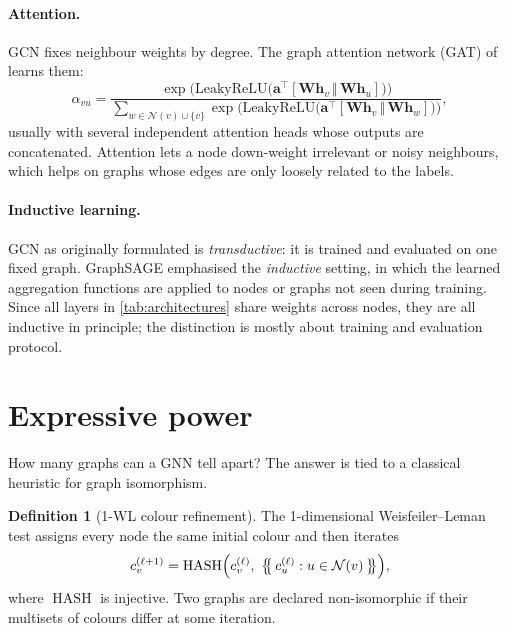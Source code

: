 \documentclass[11pt]{article}
\theoremstyle{plain}
\theoremstyle{definition}
\newtheorem{definition}{Definition}
\newcommand{\N}{\mathcal{N}}
\newcommand{\h}{\mathbf{h}}
\newcommand{\W}{\mathbf{W}}
\begin{document}
\paragraph{Attention.} GCN fixes neighbour weights by degree. The graph attention network (GAT) of \citet{velickovic2018} learns them:
\begin{equation}\label{eq:gat}
  \alpha_{vu} = \frac{\exp\bigl(\mathrm{LeakyReLU}\bigl(\mathbf{a}^\top[\W\h_v \,\Vert\, \W\h_u]\bigr)\bigr)}{\sum_{w\in\N(v)\cup\{v\}}\exp\bigl(\mathrm{LeakyReLU}\bigl(\mathbf{a}^\top[\W\h_v \,\Vert\, \W\h_w]\bigr)\bigr)},
\end{equation}
usually with several independent attention heads whose outputs are concatenated. Attention lets a node down-weight irrelevant or noisy neighbours, which helps on graphs whose edges are only loosely related to the labels.

\paragraph{Inductive learning.} GCN as originally formulated is \emph{transductive}: it is trained and evaluated on one fixed graph. GraphSAGE \citep{hamilton2017} emphasised the \emph{inductive} setting, in which the learned aggregation functions are applied to nodes or graphs not seen during training. Since all layers in \cref{tab:architectures} share weights across nodes, they are all inductive in principle; the distinction is mostly about training and evaluation protocol.

\section{Expressive power}
\label{sec:expressivity}

How many graphs can a GNN tell apart? The answer is tied to a classical heuristic for graph isomorphism.

\begin{definition}[1-WL colour refinement]
The 1-dimensional Weisfeiler--Leman test \citep{weisfeiler1968} assigns every node the same initial colour and then iterates
\[
  c_v^{(\ell+1)} = \operatorname{HASH}\Bigl(c_v^{(\ell)},\ \bigl\{\!\!\bigl\{\, c_u^{(\ell)} : u\in\N(v)\,\bigr\}\!\!\bigr\}\Bigr),
\]
where $\operatorname{HASH}$ is injective. Two graphs are declared non-isomorphic if their multisets of colours differ at some iteration.
\end{definition}
\end{document}
